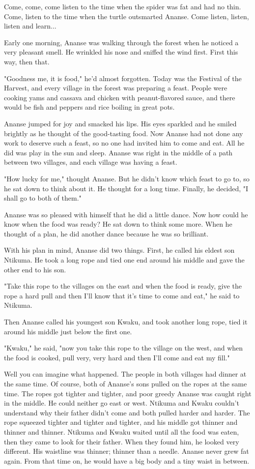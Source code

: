 Come, come, come listen to the time when the spider was fat and had no thin. Come, listen to the time when the turtle outsmarted Ananse. Come listen, listen, listen and learn...

Early one morning, Ananse was walking through the forest when he noticed a very pleasant smell. He wrinkled his nose and sniffed the wind first. First this way, then that.

"Goodness me, it is food," he'd almost forgotten. Today was the Festival of the Harvest, and every village in the forest was preparing a feast. People were cooking yams and cassava and chicken with peanut-flavored sauce, and there would be fish and peppers and rice boiling in great pots.

Ananse jumped for joy and smacked his lips. His eyes sparkled and he smiled brightly as he thought of the good-tasting food. Now Ananse had not done any work to deserve such a feast, so no one had invited him to come and eat. All he did was play in the sun and sleep. Ananse was right in the middle of a path between two villages, and each village was having a feast.

"How lucky for me," thought Ananse. But he didn't know which feast to go to, so he sat down to think about it. He thought for a long time. Finally, he decided, "I shall go to both of them."

Ananse was so pleased with himself that he did a little dance. Now how could he know when the food was ready? He sat down to think some more. When he thought of a plan, he did another dance because he was so brilliant.

With his plan in mind, Ananse did two things. First, he called his eldest son Ntikuma. He took a long rope and tied one end around his middle and gave the other end to his son.

"Take this rope to the villages on the east and when the food is ready, give the rope a hard pull and then I'll know that it's time to come and eat," he said to Ntikuma.

Then Ananse called his youngest son Kwaku, and took another long rope, tied it around his middle just below the first one.

"Kwaku," he said, "now you take this rope to the village on the west, and when the food is cooked, pull very, very hard and then I'll come and eat my fill."

Well you can imagine what happened. The people in both villages had dinner at the same time. Of course, both of Ananse's sons pulled on the ropes at the same time. The ropes got tighter and tighter, and poor greedy Ananse was caught right in the middle. He could neither go east or west. Ntikuma and Kwaku couldn't understand why their father didn't come and both pulled harder and harder. The rope squeezed tighter and tighter and tighter, and his middle got thinner and thinner and thinner. Ntikuma and Kwaku waited until all the food was eaten, then they came to look for their father. When they found him, he looked very different. His waistline was thinner; thinner than a needle. Ananse never grew fat again. From that time on, he would have a big body and a tiny waist in between.

